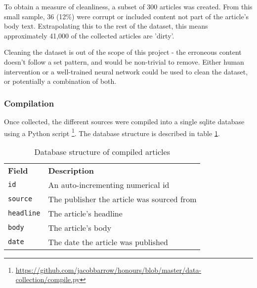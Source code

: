 To obtain a measure of cleanliness, a subset of 300 articles was created. From this small sample, 36 (12\%) were corrupt or included content not part of the article's body text. Extrapolating this to the rest of the dataset, this means approximately 41,000 of the collected articles are 'dirty'. 

Cleaning the dataset is out of the scope of this project - the erroneous content doesn't follow a set pattern, and would be non-trivial to remove. Either human intervention or a well-trained neural network could be used to clean the dataset, or potentially a combination of both.

\subsubsection{Compilation}\label{data-compilation}
Once collected, the different sources were compiled into a single sqlite database using a Python script \footnote{\url{https://github.com/jacobbarrow/honours/blob/master/data-collection/compile.py}}. The database structure is described in table \ref{tab:data-compilation}.

\begin{table}[h]
\begin{tabular}{ll}
\textbf{Field} & \textbf{Description} \\
\texttt{id} & An auto-incrementing numerical id \\
\texttt{source} & The publisher the article was sourced from \\
\texttt{headline} & The article's headline \\
\texttt{body} & The article's body \\
\texttt{date} & The date the article was published \\
\end{tabular}
\caption{Database structure of compiled articles}
\label{tab:data-compilation}
\end{table}
